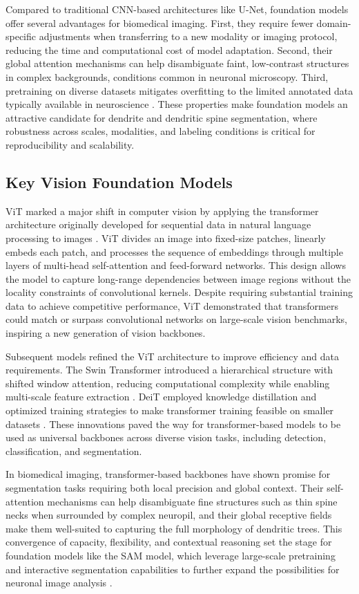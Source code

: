 Compared to traditional \gls{CNN}-based architectures like U-Net, foundation models offer several advantages for biomedical imaging. First, they require fewer domain-specific adjustments when transferring to a new modality or imaging protocol, reducing the time and computational cost of model adaptation. Second, their global attention mechanisms can help disambiguate faint, low-contrast structures in complex backgrounds, conditions common in neuronal microscopy. Third, pretraining on diverse datasets mitigates overfitting to the limited annotated data typically available in neuroscience \cite{Okabe_2020}. These properties make foundation models an attractive candidate for dendrite and dendritic spine segmentation, where robustness across scales, modalities, and labeling conditions is critical for reproducibility and scalability.


\subsection{Key Vision Foundation Models}
\gls{ViT} marked a major shift in computer vision by applying the transformer architecture originally developed for sequential data in natural language processing to images \cite{Dosovitskiy_2020}. \gls{ViT} divides an image into fixed-size patches, linearly embeds each patch, and processes the sequence of embeddings through multiple layers of multi-head self-attention and feed-forward networks. This design allows the model to capture long-range dependencies between image regions without the locality constraints of convolutional kernels. Despite requiring substantial training data to achieve competitive performance, ViT demonstrated that transformers could match or surpass convolutional networks on large-scale vision benchmarks, inspiring a new generation of vision backbones.

Subsequent models refined the \gls{ViT} architecture to improve efficiency and data requirements. The Swin Transformer introduced a hierarchical structure with shifted window attention, reducing computational complexity while enabling multi-scale feature extraction \cite{Liu_2021}. \gls{DeiT} employed knowledge distillation \cite{Hinton_2015} and optimized training strategies to make transformer training feasible on smaller datasets \cite{Touvron_2021}. These innovations paved the way for transformer-based models to be used as universal backbones across diverse vision tasks, including detection, classification, and segmentation.

In biomedical imaging, transformer-based backbones have shown promise for segmentation tasks requiring both local precision and global context. Their self-attention mechanisms can help disambiguate fine structures such as thin spine necks when surrounded by complex neuropil, and their global receptive fields make them well-suited to capturing the full morphology of dendritic trees. This convergence of capacity, flexibility, and contextual reasoning set the stage for foundation models like the \gls{SAM} model, which leverage large-scale pretraining and interactive segmentation capabilities to further expand the possibilities for neuronal image analysis \cite{Kirillov_2023}.

